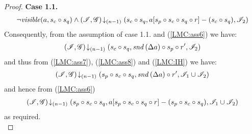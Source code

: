 \begin{lemma}
\begin{proof}
\noindent\textbf{Case 1.1.} 
\[
\begin{array}{l}
	\neg\mathit{visible}(a, s_c \circ s_q) \land  \left(\mathscr{I}, \mathscr{G}\right) \!\downarrow_{(n-1)} \left(s_c \circ s_q, a[s_p \circ s_c \circ s_q \circ r]-(s_c \circ s_q), \mathscr{I}_2\right)
\end{array}
\]
Consequently, from the assumption of case 1.1. and (\ref{LMC:ass6}) we have: 
\begin{align}
	\left(\mathscr{I}, \mathscr{G}\right) \!\downarrow_{(n-1)} \left(s_c \circ s_q, \mathit{snd}\left(\Delta {a}\right) \circ s_p \circ r', \mathscr{I}_2\right) \label{LMC:ass8}
\end{align}
%
and thus from (\ref{LMC:ass7}), (\ref{LMC:ass8}) and (\ref{LMC:IH}) we have:
%
\begin{align*}
	\left(\mathscr{I}, \mathscr{G}\right) \!\downarrow_{(n-1)} \left(s_p \circ s_c \circ s_q, \mathit{snd}\left(\Delta {a}\right) \circ r', \mathscr{I}_1 \cup \mathscr{I}_2\right)
\end{align*}
and hence from (\ref{LMC:ass6})
%
\begin{align*}
	\left(\mathscr{I}, \mathscr{G}\right) \!\downarrow_{(n-1)} \left(s_p \circ s_c \circ s_q, a[s_p \circ s_c \circ s_q \circ r] - (s_p \circ s_c \circ s_q), \mathscr{I}_1 \cup \mathscr{I}_2\right)
\end{align*}
as required.\\
%
%
%
%
%


\end{proof}
\end{lemma}
